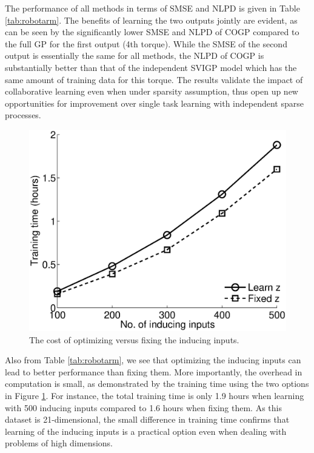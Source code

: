 The performance of all methods in terms of SMSE and NLPD is given in Table \ref{tab:robotarm}.
The benefits of learning the two outputs jointly are evident, as can be seen by the significantly lower SMSE and NLPD of COGP compared to the full GP for the first output (4th torque).
While the SMSE of the second output is essentially the same for all methods, the NLPD of COGP is substantially better than that of the independent SVIGP model which has the same amount of training data for this torque.
The results validate the impact of collaborative learning even when under sparsity assumption, thus open up new opportunities for improvement over single task learning with independent sparse processes.

\begin{figure}
\includegraphics[scale=0.4]{figures/sarcosTime.eps}
\caption{The cost of optimizing versus fixing the inducing inputs.}
\label{fig:time}
\end{figure}

Also from Table \ref{tab:robotarm}, we see that optimizing the inducing inputs can lead to better performance than fixing them.
More importantly, the overhead in computation is small, as demonstrated by the training time using the two options in Figure \ref{fig:time}.
For instance, the total training time is only 1.9 hours when learning with 500 inducing inputs compared to 1.6 hours when fixing them.
As this dataset is 21-dimensional, the small difference in training time confirms that learning of the inducing inputs is a practical option even when dealing with problems of high dimensions.
